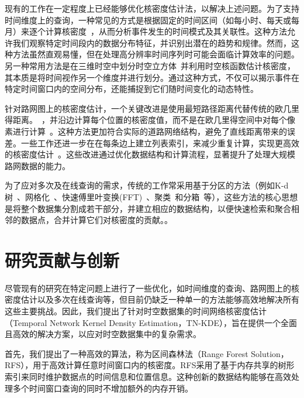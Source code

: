 现有的工作在一定程度上已经能够优化核密度估计法，以解决上述问题。为了支持时间维度上的查询，一种常见的方式是根据固定的时间区间（如每小时、每天或每月）来逐个计算核密度~\cite{plug_spatial_2011}，从而分析事件发生的时间模式及其关联性。这种方法允许我们观察特定时间段内的数据分布特征，并识别出潜在的趋势和规律。然而，这种方法虽然直观易懂，但在处理高分辨率时间序列时可能会面临计算效率的问题。
另一种常用方法是在三维时空中划分时空立方体~\cite{nakaya_visualising_2010, black_highway_1991}并利用时空核函数估计核密度\cite{brunsdon_visualising_2007, romano_visualizing_2017, chan_sws_2021}，其本质是将时间视作另一个维度并进行划分。通过这种方式，不仅可以揭示事件在特定时间窗口内的空间分布，还能捕捉到它们随时间变化的动态特性。

针对路网图上的核密度估计，一个关键改进是使用最短路径距离代替传统的欧几里得距离。~\cite{borruso_network_2005}，并沿边计算每个位置的核密度值，而不是在欧几里得空间中对每个像素进行计算~\cite{xie_kernel_2008}。这种方法更加符合实际的道路网络结构，避免了直线距离带来的误差。一些工作还进一步在在每条边上建立列表索引，来减少重复计算，实现更高效的核密度估计~\cite{chan_fast_2021}。这些改进通过优化数据结构和计算流程，显著提升了处理大规模路网数据的能力。


为了应对多次及在线查询的需求，传统的工作常采用基于分区的方法（例如K-d树~\cite{chan_efficient_2020, chan_quad_2020, chan_karl_2019}、网格化~\cite{hart_kernel_2014, black_highway_1991}、快速傅里叶变换(FFT)~\cite{silverman_algorithm_1982, gramacki_nonparametric_2018}、聚类~\cite{auber_interactive_2005, abello_ask-graphview_2006, hinneburg_denclue_2007}和分箱~\cite{liu_immens_2013, gramacki_nonparametric_2018, li_interactive_2014}等），这些方法的核心思想是将整个数据集分割成若干部分，并建立相应的数据结构，以便快速检索和聚合相邻的数据点，合并计算它们对核密度的贡献。\cite{liu_immens_2013}。

\section{研究贡献与创新}

尽管现有的研究在特定问题上进行了一些优化，如时间维度的查询、路网图上的核密度估计以及多次在线查询等，但目前仍缺乏一种单一的方法能够高效地解决所有这些主要挑战。因此，我们提出了针对时空数据集的时间网络核密度估计（Temporal Network Kernel Density Estimation，TN-KDE），旨在提供一个全面且高效的解决方案，以应对时空数据集中的复杂需求。

首先，我们提出了一种高效的算法，称为区间森林法（Range Forest Solution，RFS），用于高效计算任意时间窗口内的核密度。RFS采用了基于内存共享的树形索引来同时维护数据点的时间信息和位置信息。这种创新的数据结构能够在高效处理多个时间窗口查询的同时不增加额外的内存开销。

